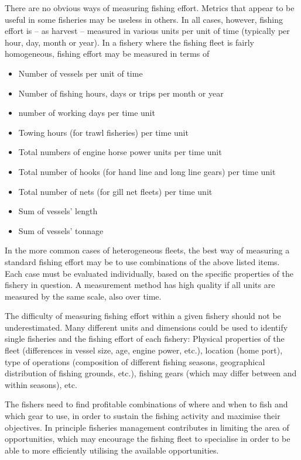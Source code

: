 \documentclass[11pt,fleqn]{book} %
\begin{document}
There are no obvious ways of measuring fishing effort. Metrics that appear to be useful in some fisheries may be useless in others. In all cases, however, fishing effort is -- as harvest -- measured in various units per unit of time (typically per hour, day, month or year). In a fishery where the fishing fleet is fairly homogeneous, fishing effort may be measured in terms of   
\begin{itemize}
\item Number of vessels per unit of time
\item Number of fishing hours, days or trips per month or year
\item number of working days per time unit
\item Towing hours (for trawl fisheries) per time unit
\item Total numbers of engine horse power units per time unit
\item Total number of hooks (for hand line and long line gears) per time unit
\item Total number of nets (for gill net fleets) per time unit
\item Sum of vessels' length
\item Sum of vessels' tonnage
\end{itemize}
\hfill\break
In the more common cases of heterogeneous fleets, the best way of measuring a standard fishing effort may be to use combinations of the above listed items. Each case must be evaluated individually, based on the specific properties of the fishery in question. A measurement method has high quality if all units are measured by the same scale, also over time.

The difficulty of measuring fishing effort within a given fishery should not be underestimated. Many different units and dimensions could be used to identify single fisheries and the fishing effort of each fishery: Physical properties of the fleet (differences in vessel size, age, engine power, etc.), location (home port), type of operations (composition of different fishing seasons, geographical distribution of fishing grounds, etc.), fishing gears (which may differ between and within seasons), etc.

The fishers need to find profitable combinations of where and when to fish and which gear to use, in order to sustain the fishing activity and maximise their objectives. In principle fisheries management contributes in limiting the area of opportunities, which may encourage the fishing fleet to  specialise in order to be able to more efficiently utilising the available opportunities. 
\end{document}
